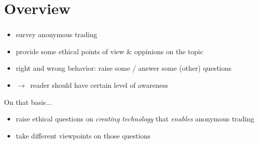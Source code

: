 \section{Overview}

\begin{frame}
    \frametitle{\insertsection}

    \begin{itemize}
        \itemsep\setlength{0.8em}
        \item survey anonymous trading
        \item provide some ethical points of view \& oppinions on the topic
        \item right and wrong behavior: raise some / answer some (other) questions
        \item $\rightarrow$~reader should have certain level of awareness
    \end{itemize}
    \vspace{.8em}
    On that basis...
    \vspace{.8em}
    \begin{itemize}
        \itemsep\setlength{0.8em}
        \item raise ethical questions on \emph{creating technology} that \emph{enables} anonymous trading
        \item take different viewpoints on those questions
    \end{itemize}
\end{frame}